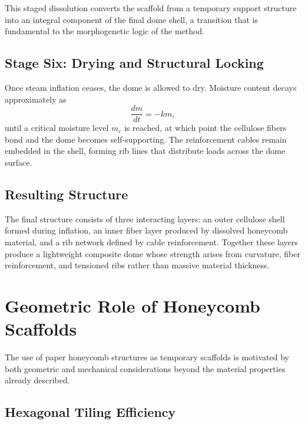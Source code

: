 \documentclass[12pt,a4paper]{article}
\begin{document}
This staged dissolution converts the scaffold from a temporary support
structure into an integral component of the final dome shell, a
transition that is fundamental to the morphogenetic logic of the method.

\subsection{Stage Six: Drying and Structural Locking}

Once steam inflation ceases, the dome is allowed to dry. Moisture
content decays approximately as
\begin{equation}
\frac{dm}{dt} = -k m,
\end{equation}
until a critical moisture level $m_c$ is reached, at which point the
cellulose fibers bond and the dome becomes self-supporting. The
reinforcement cables remain embedded in the shell, forming rib lines
that distribute loads across the dome surface.

\subsection{Resulting Structure}

The final structure consists of three interacting layers: an outer
cellulose shell formed during inflation, an inner fiber layer produced
by dissolved honeycomb material, and a rib network defined by cable
reinforcement. Together these layers produce a lightweight composite
dome whose strength arises from curvature, fiber reinforcement, and
tensioned ribs rather than massive material thickness.

\section{Geometric Role of Honeycomb Scaffolds}

The use of paper honeycomb structures as temporary scaffolds is
motivated by both geometric and mechanical considerations beyond the
material properties already described.

\subsection{Hexagonal Tiling Efficiency}
\end{document}
